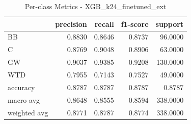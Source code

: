 \begin{table}
\caption{Per-class Metrics - XGB_k24_finetuned_ext}
\begin{tabular}{lrrrr}
\toprule
 & precision & recall & f1-score & support \\
\midrule
BB & 0.8830 & 0.8646 & 0.8737 & 96.0000 \\
C & 0.8769 & 0.9048 & 0.8906 & 63.0000 \\
GW & 0.9037 & 0.9385 & 0.9208 & 130.0000 \\
WTD & 0.7955 & 0.7143 & 0.7527 & 49.0000 \\
accuracy & 0.8787 & 0.8787 & 0.8787 & 0.8787 \\
macro avg & 0.8648 & 0.8555 & 0.8594 & 338.0000 \\
weighted avg & 0.8771 & 0.8787 & 0.8774 & 338.0000 \\
\bottomrule
\end{tabular}
\end{table}
